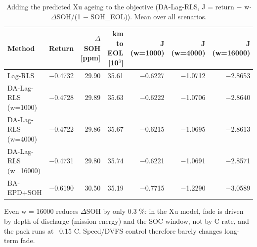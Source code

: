 \begin{table}[t]
\centering
\caption{Adding the predicted Xu ageing to the objective (DA-Lag-RLS, J = return $-$ w$\cdot$$\Delta$SOH/(1 $-$ SOH\_EOL)). Mean over all scenarios.}
\label{tab:degradation_aware}
\footnotesize
\setlength{\tabcolsep}{4pt}
\begin{tabular}{lrrrrrr}
\toprule
Method & Return & $\Delta$SOH [ppm] & km to EOL [10$^3$] & J (w=1000) & J (w=4000) & J (w=16000) \\
\midrule
Lag-RLS & $-$0.4732 & 29.90 & 35.61 & $-$0.6227 & $-$1.0712 & $-$2.8653 \\
DA-Lag-RLS (w=1000) & $-$0.4728 & 29.89 & 35.63 & $-$0.6222 & $-$1.0706 & $-$2.8640 \\
DA-Lag-RLS (w=4000) & $-$0.4722 & 29.86 & 35.67 & $-$0.6215 & $-$1.0695 & $-$2.8613 \\
DA-Lag-RLS (w=16000) & $-$0.4731 & 29.80 & 35.74 & $-$0.6221 & $-$1.0691 & $-$2.8571 \\
\midrule
BA-EPD+SOH & $-$0.6190 & 30.50 & 35.19 & $-$0.7715 & $-$1.2290 & $-$3.0589 \\
\bottomrule
\end{tabular}
\par\vspace{2pt}\parbox{\linewidth}{\scriptsize Even w = 16000 reduces $\Delta$SOH by only 0.3 \%: in the Xu model, fade is driven by depth of discharge (mission energy) and the SOC window, not by C-rate, and the pack runs at ~0.15 C. Speed/DVFS control therefore barely changes long-term fade.}
\end{table}
